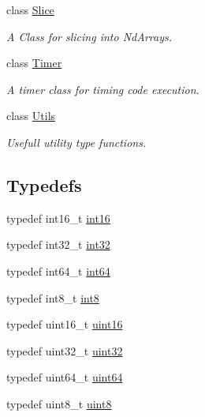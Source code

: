 \begin{DoxyCompactItemize}
class \mbox{\hyperlink{class_num_cpp_1_1_slice}{Slice}}
\begin{DoxyCompactList}\small\item\em A Class for slicing into Nd\+Arrays. \end{DoxyCompactList}\item 
class \mbox{\hyperlink{class_num_cpp_1_1_timer}{Timer}}
\begin{DoxyCompactList}\small\item\em A timer class for timing code execution. \end{DoxyCompactList}\item 
class \mbox{\hyperlink{class_num_cpp_1_1_utils}{Utils}}
\begin{DoxyCompactList}\small\item\em Usefull utility type functions. \end{DoxyCompactList}\end{DoxyCompactItemize}
\subsection*{Typedefs}
\begin{DoxyCompactItemize}
\item 
typedef int16\+\_\+t \mbox{\hyperlink{namespace_num_cpp_a4cf8a907fdc869d71f98ca69efb7ea09}{int16}}
\item 
typedef int32\+\_\+t \mbox{\hyperlink{namespace_num_cpp_acf3eb1592f8b248ff0a236634864633c}{int32}}
\item 
typedef int64\+\_\+t \mbox{\hyperlink{namespace_num_cpp_a22e530c7304044b86c04203429f3dcd1}{int64}}
\item 
typedef int8\+\_\+t \mbox{\hyperlink{namespace_num_cpp_a7f7ba56fbcdea3aa31f11382416d2e4d}{int8}}
\item 
typedef uint16\+\_\+t \mbox{\hyperlink{namespace_num_cpp_a3078cddd091529b8dd3e7828fa9a9926}{uint16}}
\item 
typedef uint32\+\_\+t \mbox{\hyperlink{namespace_num_cpp_a36f388e948380413c63011cab9b7fbd5}{uint32}}
\item 
typedef uint64\+\_\+t \mbox{\hyperlink{namespace_num_cpp_a9b8a75722198a622843adfb37b1b2e9d}{uint64}}
\item 
typedef uint8\+\_\+t \mbox{\hyperlink{namespace_num_cpp_aee396d0469d6031cd18118c0a45bcdda}{uint8}}
\end{DoxyCompactItemize}
